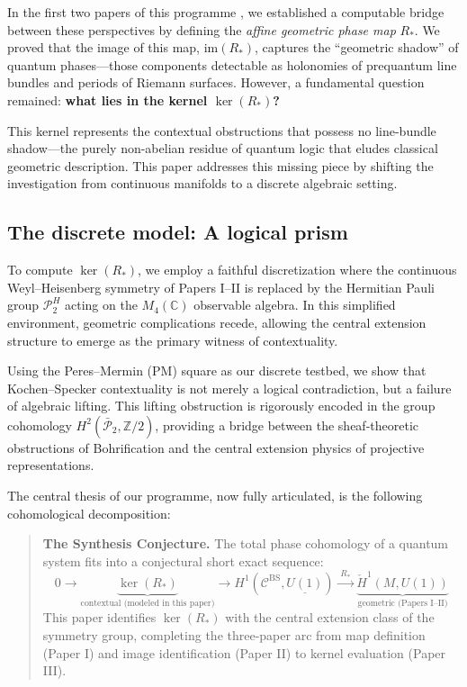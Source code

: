 \documentclass[11pt]{article}
\begin{document}
In the first two papers of this programme \cite{PaperI, PaperII}, we established a computable bridge between these perspectives by defining the \emph{affine geometric phase map} $R_*$. We proved that the image of this map, $\mathrm{im}(R_*)$, captures the ``geometric shadow'' of quantum phases---those components detectable as holonomies of prequantum line bundles and periods of Riemann surfaces. However, a fundamental question remained: \textbf{what lies in the kernel $\ker(R_*)$?}

This kernel represents the contextual obstructions that possess no line-bundle shadow---the purely non-abelian residue of quantum logic that eludes classical geometric description. This paper addresses this missing piece by shifting the investigation from continuous manifolds to a discrete algebraic setting.

\subsection{The discrete model: A logical prism}

To compute $\ker(R_*)$, we employ a faithful discretization where the continuous Weyl--Heisenberg symmetry of Papers I--II is replaced by the Hermitian Pauli group $\mathcal{P}_2^H$ acting on the $M_4(\mathbb{C})$ observable algebra. In this simplified environment, geometric complications recede, allowing the central extension structure to emerge as the primary witness of contextuality.

Using the Peres--Mermin (PM) square \cite{Peres90, Mermin90} as our discrete testbed, we show that Kochen--Specker contextuality is not merely a logical contradiction, but a failure of algebraic lifting. This lifting obstruction is rigorously encoded in the group cohomology $H^2(\bar{\mathcal{P}}_2, \mathbb{Z}/2)$, providing a bridge between the sheaf-theoretic obstructions of Bohrification and the central extension physics of projective representations.

The central thesis of our programme, now fully articulated, is the following cohomological decomposition:

\begin{quote}
\textbf{The Synthesis Conjecture.} The total phase cohomology of a quantum system fits into a conjectural short exact sequence:
\[
  0 \longrightarrow \underbrace{\ker(R_*)}_{\text{contextual (modeled in this paper)}}
  \longrightarrow H^1(\mathcal{C}^{\mathrm{BS}}, \underline{U(1)})
  \xrightarrow{\;R_*\;} \underbrace{\check{H}^1(M, U(1))}_{\text{geometric (Papers I--II)}}
\]
This paper identifies $\ker(R_*)$ with the central extension class of the symmetry group, completing the three-paper arc from map definition (Paper I) and image identification (Paper II) to kernel evaluation (Paper III).
\end{quote}
\end{document}
